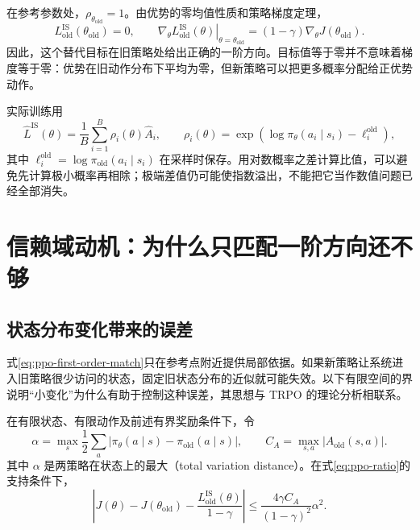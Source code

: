\documentclass[UTF8]{ctexart}
\begin{document}
在参考参数处，$\rho_{\theta_{\mathrm{old}}}=1$。由优势的零均值性质和策略梯度定理，
\begin{equation}
  L_{\mathrm{old}}^{\mathrm{IS}}(\theta_{\mathrm{old}})=0,
  \qquad
  \left.\nabla_\theta L_{\mathrm{old}}^{\mathrm{IS}}(\theta)
  \right|_{\theta=\theta_{\mathrm{old}}}
  =(1-\gamma)\nabla_\theta J(\theta_{\mathrm{old}}).
  \label{eq:ppo-first-order-match}
\end{equation}
因此，这个替代目标在旧策略处给出正确的一阶方向。目标值等于零并不意味着梯度等于零：优势在旧动作分布下平均为零，但新策略可以把更多概率分配给正优势动作。

实际训练用
\begin{equation}
  \widehat L^{\mathrm{IS}}(\theta)
  =\frac1B\sum_{i=1}^{B}\rho_i(\theta)\widehat A_i,
  \qquad
  \rho_i(\theta)=
  \exp\!\left(\log\pi_\theta(a_i\mid s_i)-\ell_i^{\mathrm{old}}\right),
  \label{eq:ppo-empirical-surrogate}
\end{equation}
其中 $\ell_i^{\mathrm{old}}=\log\pi_{\mathrm{old}}(a_i\mid s_i)$ 在采样时保存。用对数概率之差计算比值，可以避免先计算极小概率再相除；极端差值仍可能使指数溢出，不能把它当作数值问题已经全部消失。

\section{信赖域动机：为什么只匹配一阶方向还不够}
\label{sec:ppo-trust-region}

\subsection{状态分布变化带来的误差}

式\eqref{eq:ppo-first-order-match}只在参考点附近提供局部依据。如果新策略让系统进入旧策略很少访问的状态，固定旧状态分布的近似就可能失效。以下有限空间的界说明“小变化”为什么有助于控制这种误差，其思想与 TRPO 的理论分析相联系\cite{schulman-trpo}。

\begin{proposition}[一个替代目标误差界]
\label{prop:ppo-surrogate-bound}
在有限状态、有限动作及前述有界奖励条件下，令
\[
  \alpha=\max_s\frac12\sum_a
    |\pi_\theta(a\mid s)-\pi_{\mathrm{old}}(a\mid s)|,
  \qquad
  C_A=\max_{s,a}|A_{\mathrm{old}}(s,a)|.
\]
其中 $\alpha$ 是两策略在状态上的最大（total variation distance）。在式\eqref{eq:ppo-ratio}的支持条件下，
\begin{equation}
  \left|J(\theta)-J(\theta_{\mathrm{old}})
       -\frac{L_{\mathrm{old}}^{\mathrm{IS}}(\theta)}{1-\gamma}\right|
  \le \frac{4\gamma C_A}{(1-\gamma)^2}\alpha^2.
  \label{eq:ppo-surrogate-bound}
\end{equation}
\end{proposition}
\end{document}
